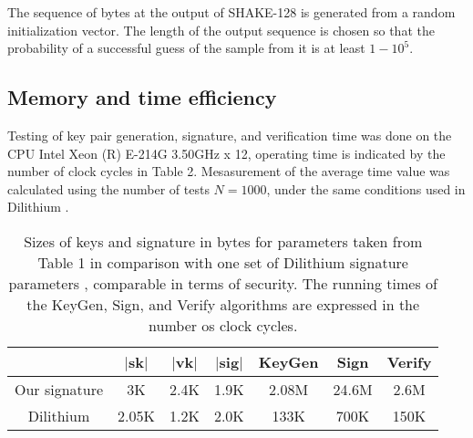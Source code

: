 \documentclass{article}
\theoremstyle{plain}
\theoremstyle{definition}
\begin{document}
    The sequence of bytes at the output of SHAKE-128 is generated from a random initialization vector. The length of the output sequence is chosen so that the probability of a successful guess of the sample from it is at least $1 - 10^5$.

    \subsection{Memory and time efficiency}
    \label{sec:memory}

    Testing of key pair generation, signature, and verification time was done on the CPU Intel Xeon (R) E-214G 3.50GHz x 12, operating time is indicated by the number of clock cycles in Table 2. Mesasurement of the average time value was calculated using the number of tests $N = 1000$, under the same conditions used in Dilithium \cite{DKL+18}.

    \begin{table}[H]
    \begin{center}
    \begin{tabular}{c c c c | c c c}
        \hline
                      & $|$sk$|$  & $|$vk$|$ & $|$sig$|$ & KeyGen & Sign & Verify \\
        \hline
        Our signature & 3K    & 2.4K & 1.9K  & 2.08M & 24.6M & 2.6M \\
        Dilithium     & 2.05K & 1.2K & 2.0K  & 133K & 700K & 150K\\
        \hline
    \end{tabular}
    \end{center}
    \caption{\label{tab:Table-2} Sizes of keys and signature in bytes for parameters taken from Table 1 in comparison with one set of Dilithium signature parameters \cite{DKL+18}, comparable in terms of security. The running times of the KeyGen, Sign, and Verify algorithms are expressed in the number os clock cycles.}
    \end{table}


\newpage
    \nocite{*}
    

    
\end{document}
